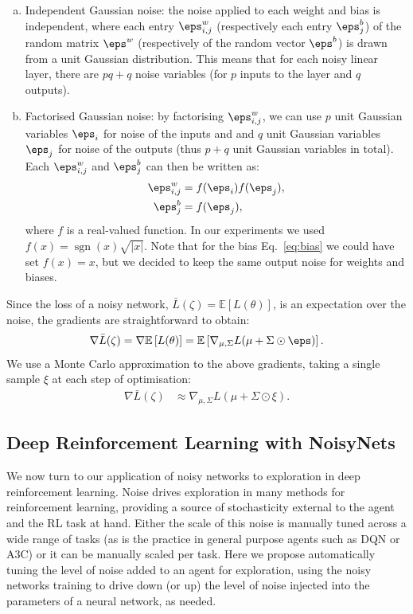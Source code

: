 \documentclass{article}
\newcommand{\sgn}{\operatorname*{sgn}}
\begin{document}
\begin{enumerate}[(a)]
    \item Independent Gaussian noise: the noise applied to each weight and bias is independent, where each entry $\eps^w_{i,j}$ (respectively each entry $\eps^b_j$) of the random matrix $\eps^w$ (respectively of the random vector $\eps^b$) is drawn from a unit Gaussian distribution.
    This means that for each noisy linear layer, there are $pq+q$ noise variables (for $p$ inputs to the layer and $q$ outputs).
    \item Factorised Gaussian noise: by factorising $\eps^w_{i,j}$, we can use $p$ unit Gaussian variables $\eps_i$ for noise of the inputs and
and $q$ unit Gaussian variables $\eps_j$ for noise of the outputs (thus $p+q$ unit Gaussian variables in total). 
Each $\eps^w_{i,j}$ and $\eps^b_j$ can then be written as:
\begin{align}
\eps^w_{i,j}& = f(\eps_i)f(\eps_j), \\
\eps^b_j& = f(\eps_j), \label{eq:bias}
\end{align}
where $f$ is a real-valued  function.
In our experiments we used $f(x) = \sgn(x)\sqrt{|x|}$. Note that for the bias Eq.~\eqref{eq:bias} we could have set $f(x)=x$, but we decided to keep the same output noise for weights and biases.
\end{enumerate}
%
Since the loss of a noisy network, $\bar L(\zeta) = \mathbb{E}\left[L(\theta)\right]$, is an expectation over the noise, the gradients are straightforward to obtain:
\begin{align}
\nabla \bar L(\zeta)= \nabla \mathbb{E}\left[L(\theta)\right]= \mathbb{E}\left[\nabla_{\mu,\Sigma} L(\mu + \Sigma\odot \eps)\right].
\end{align}
We use a Monte Carlo approximation to the above gradients, taking a single sample $\xi$ at each step of optimisation:
\begin{align}
\nabla \bar L(\zeta) &\approx \nabla_{\mu,\Sigma} L(\mu + \Sigma\odot \xi).
\end{align}
%
%
\subsection{Deep Reinforcement Learning with NoisyNets}
\label{sec:Reinforcement Learning using Randomised Networks}
%
We now turn to our application of noisy networks to exploration in deep reinforcement learning.
Noise drives exploration in many methods for reinforcement learning, providing a source of stochasticity external to the agent and the RL task at hand.
Either the scale of this noise is manually tuned across a wide range of tasks (as is the practice in general purpose agents such as DQN or A3C) or it can be manually scaled per task.
Here we propose automatically tuning the level of noise added to an agent for exploration, using the noisy networks training to drive down (or up) the level of noise injected into the parameters of a neural network, as needed.
\end{document}
